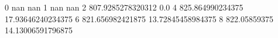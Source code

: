 0 nan nan
1 nan nan
2 807.9285278320312 0.0
4 825.864990234375 17.93646240234375
6 821.656982421875 13.72845458984375
8 822.05859375 14.13006591796875
